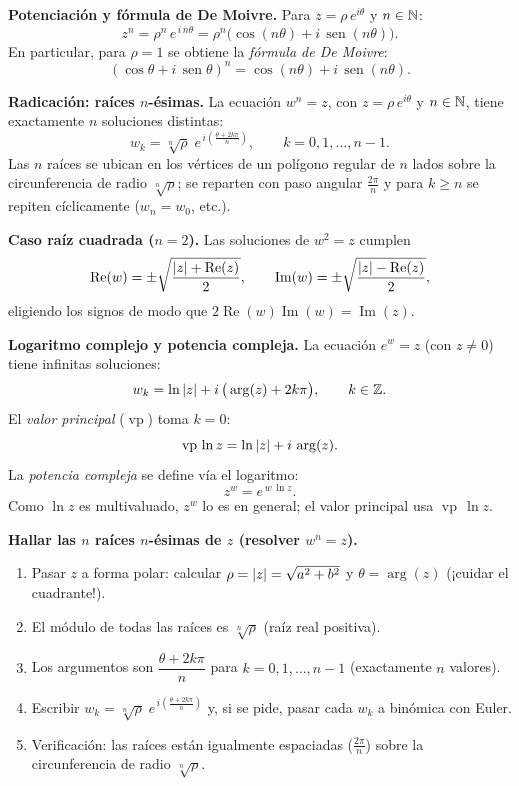 \begin{teoria}
\textbf{Potenciación y fórmula de De Moivre.} Para $z = \rho\,e^{i\theta}$ y $n \in \mathbb{N}$:
\[
z^n = \rho^n\, e^{\,i\,n\theta} = \rho^n\big(\cos(n\theta) + i\,\operatorname{sen}(n\theta)\big).
\]
En particular, para $\rho = 1$ se obtiene la \emph{fórmula de De Moivre}:
\[
(\cos\theta + i\,\operatorname{sen}\theta)^n = \cos(n\theta) + i\,\operatorname{sen}(n\theta).
\]
\end{teoria}

\begin{teoria}
\textbf{Radicación: raíces $n$-ésimas.} La ecuación $w^n = z$, con $z = \rho\,e^{i\theta}$ y $n \in \mathbb{N}$, tiene exactamente $n$ soluciones distintas:
\[
w_k = \sqrt[n]{\rho}\; e^{\,i\left(\frac{\theta + 2k\pi}{n}\right)}, \qquad k = 0, 1, \dots, n-1.
\]
Las $n$ raíces se ubican en los vértices de un polígono regular de $n$ lados sobre la circunferencia de radio $\sqrt[n]{\rho}$; se reparten con paso angular $\tfrac{2\pi}{n}$ y para $k \ge n$ se repiten cíclicamente ($w_n = w_0$, etc.).

\medskip
\textbf{Caso raíz cuadrada ($n=2$).} Las soluciones de $w^2 = z$ cumplen
\[
\operatorname{Re}(w) = \pm\sqrt{\frac{\left\lvert z \right\rvert + \operatorname{Re}(z)}{2}}, \qquad
\operatorname{Im}(w) = \pm\sqrt{\frac{\left\lvert z \right\rvert - \operatorname{Re}(z)}{2}},
\]
eligiendo los signos de modo que $2\operatorname{Re}(w)\operatorname{Im}(w) = \operatorname{Im}(z)$.
\end{teoria}

\begin{teoria}
\textbf{Logaritmo complejo y potencia compleja.} La ecuación $e^w = z$ (con $z \neq 0$) tiene infinitas soluciones:
\[
w_k = \ln\left\lvert z \right\rvert + i\,\big(\arg(z) + 2k\pi\big), \qquad k \in \mathbb{Z}.
\]
El \emph{valor principal} ($\operatorname{vp}$) toma $k=0$:
\[
\operatorname{vp}\,\ln z = \ln\left\lvert z \right\rvert + i\,\arg(z).
\]
La \emph{potencia compleja} se define vía el logaritmo:
\[
z^w = e^{\,w\,\ln z}.
\]
Como $\ln z$ es multivaluado, $z^w$ lo es en general; el valor principal usa $\operatorname{vp}\,\ln z$.
\end{teoria}

\begin{receta}
\textbf{Hallar las $n$ raíces $n$-ésimas de $z$ (resolver $w^n = z$).}
\begin{enumerate}
  \item Pasar $z$ a forma polar: calcular $\rho = \left\lvert z \right\rvert = \sqrt{a^2+b^2}$ y $\theta = \arg(z)$ (¡cuidar el cuadrante!).
  \item El módulo de todas las raíces es $\sqrt[n]{\rho}$ (raíz real positiva).
  \item Los argumentos son $\dfrac{\theta + 2k\pi}{n}$ para $k = 0, 1, \dots, n-1$ (exactamente $n$ valores).
  \item Escribir $w_k = \sqrt[n]{\rho}\; e^{\,i\left(\frac{\theta + 2k\pi}{n}\right)}$ y, si se pide, pasar cada $w_k$ a binómica con Euler.
  \item Verificación: las raíces están igualmente espaciadas ($\tfrac{2\pi}{n}$) sobre la circunferencia de radio $\sqrt[n]{\rho}$.
\end{enumerate}
\end{receta}

